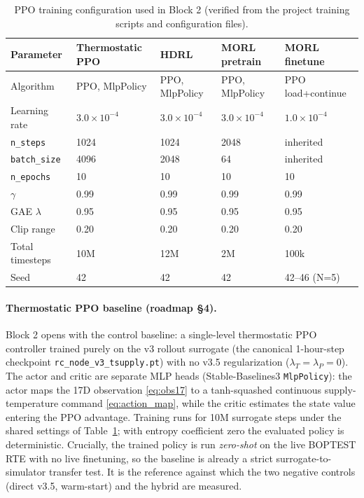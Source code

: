 \documentclass[11pt,a4paper]{article}
\begin{document}
\begin{table}[H]
\centering
\caption{PPO training configuration used in Block 2 (verified from the project training scripts and configuration files).}
\label{tab:ppo_hparams}
\small
\begin{tabular}{lllll}
\toprule
Parameter & Thermostatic PPO & HDRL & MORL pretrain & MORL finetune \\
\midrule
Algorithm & PPO, MlpPolicy & PPO, MlpPolicy & PPO, MlpPolicy & PPO load+continue \\
Learning rate & $3.0{\times}10^{-4}$ & $3.0{\times}10^{-4}$ & $3.0{\times}10^{-4}$ & $1.0{\times}10^{-4}$ \\
\texttt{n\_steps} & 1024 & 1024 & 2048 & inherited \\
\texttt{batch\_size} & 4096 & 2048 & 64 & inherited \\
\texttt{n\_epochs} & 10 & 10 & 10 & 10 \\
$\gamma$ & 0.99 & 0.99 & 0.99 & 0.99 \\
GAE $\lambda$ & 0.95 & 0.95 & 0.95 & 0.95 \\
Clip range & 0.20 & 0.20 & 0.20 & 0.20 \\
Total timesteps & 10M & 12M & 2M & 100k \\
Seed & 42 & 42 & 42 & 42--46 (N=5) \\
\bottomrule
\end{tabular}
\end{table}

\paragraph{Thermostatic PPO baseline (roadmap \S4).} Block 2 opens with the control baseline: a single-level thermostatic PPO controller trained purely on the v3 rollout surrogate (the canonical 1-hour-step checkpoint \texttt{rc\_node\_v3\_tsupply.pt}) with no v3.5 regularization ($\lambda_T=\lambda_P=0$). The actor and critic are separate MLP heads (Stable-Baselines3 \texttt{MlpPolicy}): the actor maps the 17D observation \eqref{eq:obs17} to a tanh-squashed continuous supply-temperature command \eqref{eq:action_map}, while the critic estimates the state value entering the PPO advantage. Training runs for 10M surrogate steps under the shared settings of Table~\ref{tab:ppo_hparams}; with entropy coefficient zero the evaluated policy is deterministic. Crucially, the trained policy is run \emph{zero-shot} on the live BOPTEST RTE with no live finetuning, so the baseline is already a strict surrogate-to-simulator transfer test. It is the reference against which the two negative controls (direct v3.5, warm-start) and the hybrid are measured.
\end{document}
